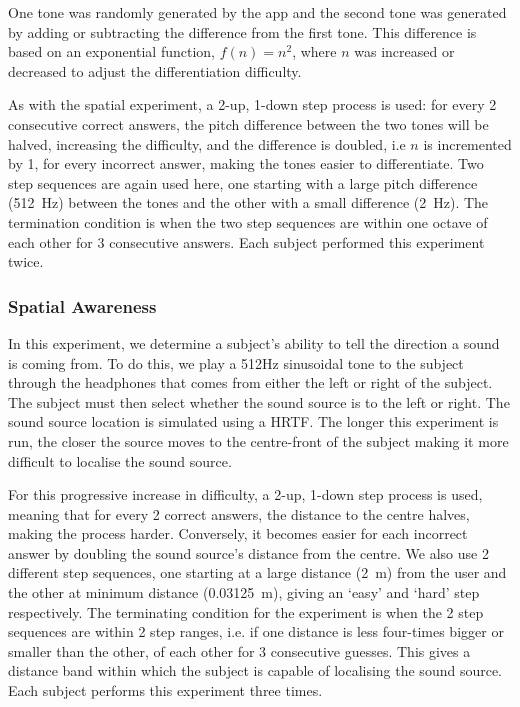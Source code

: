 \documentclass[format=sigconf, review=true, screen=true, anonymous=true]{acmart}
\begin{document}
One tone was randomly generated by the app and the second tone was generated by adding or subtracting the difference from the first tone. This difference is based on an exponential function, $f(n) = n^2$, where $n$ was increased or decreased to adjust the differentiation difficulty. 

As with the spatial experiment, a 2-up, 1-down step process is used: for every 2 consecutive correct answers, the pitch difference between the two tones will be halved, increasing the difficulty, and the difference is doubled, i.e $n$ is incremented by 1, for every incorrect answer, making the tones easier to differentiate. Two step sequences are again used here, one starting with a large pitch difference (\SI{512}{\hertz}) between the tones and the other with a small difference (\SI{2}{\hertz}). The termination condition is when the two step sequences are within one octave of each other for 3 consecutive answers. Each subject performed this experiment twice. 


\subsubsection{Spatial Awareness}

In this experiment, we determine a subject's ability to tell the direction a sound is coming from. To do this, we play a 512Hz sinusoidal tone to the subject through the headphones that comes from either the left or right of the subject. The subject must then select whether the sound source is to the left or right. The sound source location is simulated using a HRTF. The longer this experiment is run, the closer the source moves to the centre-front of the subject making it more difficult to localise the sound source. 

For this progressive increase in difficulty, a 2-up, 1-down step process is used, meaning that for every 2 correct answers, the distance to the centre halves, making the process harder. Conversely, it becomes easier for each incorrect answer by doubling the sound source's distance from the centre. We also use 2 different step sequences, one starting at a large distance (\SI{2}{\m}) from the user and the other at minimum distance (\SI{0.03125}{\m}), giving an `easy' and `hard' step respectively. The terminating condition for the experiment is when the 2 step sequences are within 2 step ranges, i.e. if one distance is less four-times bigger or smaller than the other, of each other for 3 consecutive guesses. This gives a distance band within which the subject is capable of localising the sound source. Each subject performs this experiment three times. 
\end{document}
